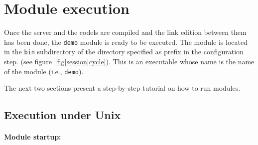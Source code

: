 \section{Module execution}
\label{sec|session|exec}

Once the server and the codels are compiled and  the link edition between
them has been done,  the \texttt{demo} module is  ready to be executed.  The
module is located in the  \texttt{bin} subdirectory of the directory
specified as prefix in the 
configuration step.     (see
figure~\ref{fig|session|cycle}). This is an executable whose name is
the   name   of the     module  (i.e., \texttt{demo}).

The   next two sections   present a step-by-step   tutorial on how to run
modules.

\subsection{Execution under Unix}
\label{ssec|exec|unix}

\paragraph{Module startup:}

